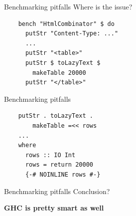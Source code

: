 \documentclass[20pt]{beamer}
\newcommand{\vspaced}{
    \vspace{5mm}
}
\begin{document}
\begin{frame}[fragile]{Benchmarking pitfalls}
    Where is the issue? \\
    \vspaced
    \begin{lstlisting}
    bench "HtmlCombinator" $ do
      putStr "Content-Type: ..."
      ...
      putStr "<table>"
      putStr $ toLazyText $
        makeTable 20000
      putStr "</table>"
    \end{lstlisting}
\end{frame}

\begin{frame}[fragile]{Benchmarking pitfalls}
    \begin{lstlisting}
    putStr . toLazyText .
        makeTable =<< rows
    ...
    where
      rows :: IO Int
      rows = return 20000
      {-# NOINLINE rows #-}
    \end{lstlisting}
\end{frame}

\begin{frame}{Benchmarking pitfalls}
    Conclusion? \\
    \vspaced
    \textbf{GHC is pretty smart as well}
\end{frame}

\end{document}

